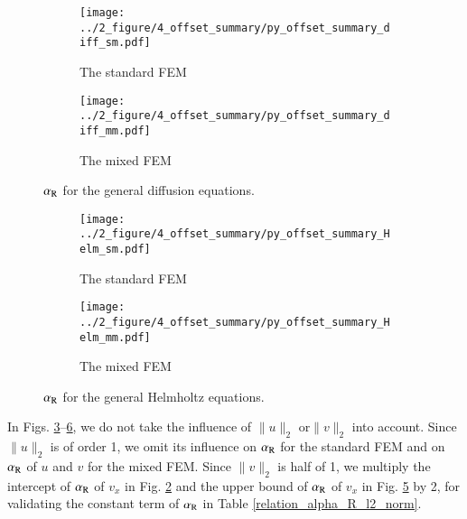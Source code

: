 \documentclass[review,3p]{elsarticle}
\begin{document}
\begin{figure}[!ht]
	\centering
    \begin{subfigure}{6.0cm}
        \texttt{[image: ../2\_figure/4\_offset\_summary/py\_offset\_summary\_diff\_sm.pdf]}
        \caption{The standard FEM}
        \label{py_offset_summary_diff_sm}
    \end{subfigure}
    \hspace{-0.2cm}
    \begin{subfigure}{6.0cm}
        \texttt{[image: ../2\_figure/4\_offset\_summary/py\_offset\_summary\_diff\_mm.pdf]}
        \caption{The mixed FEM}
        \label{py_offset_summary_diff_mm}
    \end{subfigure}
\caption{$\alpha_{\rm R}$ for the general diffusion equations.}
\label{py_offset_summary_diff}
\end{figure}

\begin{figure}[!ht]
	\centering
    \begin{subfigure}{6.0cm}
        \texttt{[image: ../2\_figure/4\_offset\_summary/py\_offset\_summary\_Helm\_sm.pdf]}
        \caption{The standard FEM}
        \label{py_offset_summary_Helm_sm}
    \end{subfigure}
    \hspace{-0.2cm}
    \begin{subfigure}{6.0cm}
        \texttt{[image: ../2\_figure/4\_offset\_summary/py\_offset\_summary\_Helm\_mm.pdf]}
        \caption{The mixed FEM}
        \label{py_offset_summary_Helm_mm}
    \end{subfigure}
\caption{$\alpha_{\rm R}$ for the general Helmholtz equations.}
\label{py_offset_summary_Helm}
\end{figure}

In Figs. \ref{py_offset_summary_diff}--\ref{py_offset_summary_Helm}, we do not take the influence of $\|u\|_2$ or$\|v\|_2$ into account. Since $\|u\|_2$ is of order 1, we omit its influence on $\alpha_{\rm R}$ for the standard FEM and on $\alpha_{\rm R}$ of $u$ and $v$ for the mixed FEM. Since $\|v\|_2$ is half of 1, we multiply the intercept of $\alpha_{\rm R}$ of $v_x$ in Fig. \ref{py_offset_summary_diff_mm} and the upper bound of $\alpha_{\rm R}$ of $v_x$ in Fig. \ref{py_offset_summary_Helm_mm} by 2, for validating the constant term of $\alpha_{\rm R}$ in Table \ref{relation_alpha_R_l2_norm}.
\end{document}
